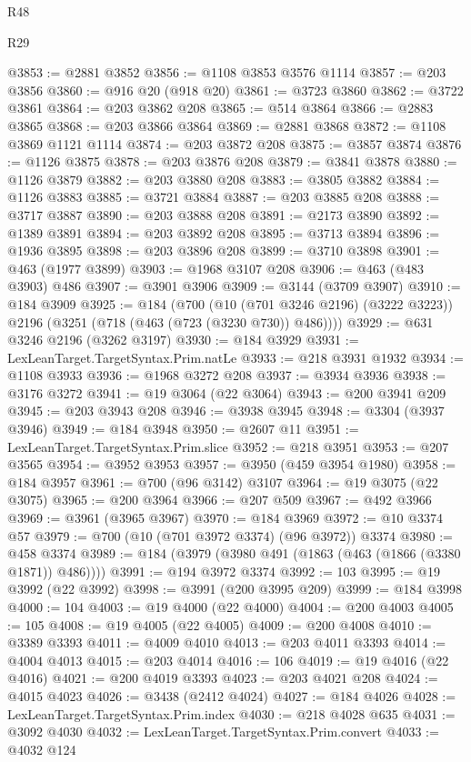 \begin{lexlean}{R48}
\begin{lexlean}{R29}
\begin{coremodule}
{{{{{{{{{{{{{{{{{{{{{{{{{{{{{{{{{{{{{{{{{{{{{{{{{{{{{{{{{{{{{{{{{{{{{{{{{{{{{{{{{{{{{{{{{{{{{{{{{{{{{{{{{{{{{{{{{{{{{{{{{{{{{{{{{{{{{{{{{{{{{{{{{{{{{{{{{{{{{{{{{{{{{{{{{{{{{{{{{{{{{{{{{{{{{{{{{{{{{{{{{{{{{{{{{{{{{{{{{{@3853 := @2881 @3852
@3856 := @1108 @3853 @3576 @1114
@3857 := @203 @3856
@3860 := @916 @20 (@918 @20)
@3861 := @3723 @3860
@3862 := @3722 @3861
@3864 := @203 @3862 @208
@3865 := @514 @3864
@3866 := @2883 @3865
@3868 := @203 @3866 @3864
@3869 := @2881 @3868
@3872 := @1108 @3869 @1121 @1114
@3874 := @203 @3872 @208
@3875 := @3857 @3874
@3876 := @1126 @3875
@3878 := @203 @3876 @208
@3879 := @3841 @3878
@3880 := @1126 @3879
@3882 := @203 @3880 @208
@3883 := @3805 @3882
@3884 := @1126 @3883
@3885 := @3721 @3884
@3887 := @203 @3885 @208
@3888 := @3717 @3887
@3890 := @203 @3888 @208
@3891 := @2173 @3890
@3892 := @1389 @3891
@3894 := @203 @3892 @208
@3895 := @3713 @3894
@3896 := @1936 @3895
@3898 := @203 @3896 @208
@3899 := @3710 @3898
@3901 := @463 (@1977 @3899)
@3903 := @1968 @3107 @208
@3906 := @463 (@483 @3903) @486
@3907 := @3901 @3906
@3909 := @3144 (@3709 @3907)
@3910 := @184 @3909
@3925 := @184
    (@700
      (@10 (@701 @3246 @2196) (@3222 @3223))
      @2196
      (@3251 (@718 (@463 (@723 (@3230 @730)) @486))))
@3929 := @631 @3246 @2196 (@3262 @3197)
@3930 := @184 @3929
@3931 := LexLeanTarget.TargetSyntax.Prim.natLe
@3933 := @218 @3931 @1932
@3934 := @1108 @3933
@3936 := @1968 @3272 @208
@3937 := @3934 @3936
@3938 := @3176 @3272
@3941 := @19 @3064 (@22 @3064)
@3943 := @200 @3941 @209
@3945 := @203 @3943 @208
@3946 := @3938 @3945
@3948 := @3304 (@3937 @3946)
@3949 := @184 @3948
@3950 := @2607 @11
@3951 := LexLeanTarget.TargetSyntax.Prim.slice
@3952 := @218 @3951
@3953 := @207 @3565
@3954 := @3952 @3953
@3957 := @3950 (@459 @3954 @1980)
@3958 := @184 @3957
@3961 := @700 (@96 @3142) @3107
@3964 := @19 @3075 (@22 @3075)
@3965 := @200 @3964
@3966 := @207 @509
@3967 := @492 @3966
@3969 := @3961 (@3965 @3967)
@3970 := @184 @3969
@3972 := @10 @3374 @57
@3979 := @700 (@10 (@701 @3972 @3374) (@96 @3972)) @3374
@3980 := @458 @3374
@3989 := @184 (@3979 (@3980 @491 (@1863 (@463 (@1866 (@3380 @1871)) @486))))
@3991 := @194 @3972 @3374
@3992 := 103
@3995 := @19 @3992 (@22 @3992)
@3998 := @3991 (@200 @3995 @209)
@3999 := @184 @3998
@4000 := 104
@4003 := @19 @4000 (@22 @4000)
@4004 := @200 @4003
@4005 := 105
@4008 := @19 @4005 (@22 @4005)
@4009 := @200 @4008
@4010 := @3389 @3393
@4011 := @4009 @4010
@4013 := @203 @4011 @3393
@4014 := @4004 @4013
@4015 := @203 @4014
@4016 := 106
@4019 := @19 @4016 (@22 @4016)
@4021 := @200 @4019 @3393
@4023 := @203 @4021 @208
@4024 := @4015 @4023
@4026 := @3438 (@2412 @4024)
@4027 := @184 @4026
@4028 := LexLeanTarget.TargetSyntax.Prim.index
@4030 := @218 @4028 @635
@4031 := @3092 @4030
@4032 := LexLeanTarget.TargetSyntax.Prim.convert
@4033 := @4032 @124
}}}}}}}}}}}}}}}}}}}}}}}}}}}}}}}}}}}}}}}}}}}}}}}}}}}}}}}}}}}}}}}}}}}}}}}}}}}}}}}}}}}}}}}}}}}}}}}}}}}}}}}}}}}}}}}}}}}}}}}}}}}}}}}}}}}}}}}}}}}}}}}}}}}}}}}}}}}}}}}}}}}}}}}}}}}}}}}}}}}}}}}}}}}}}}}}}}}}}}}}}}}}}}}}}}}}}}}}}}
\end{coremodule}
\end{lexlean}
\end{lexlean}
